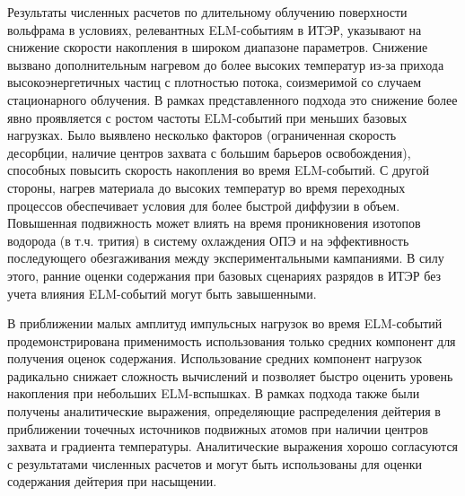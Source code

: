 Результаты численных расчетов по длительному облучению поверхности вольфрама в условиях, релевантных ELM-событиям в ИТЭР, указывают на снижение скорости накопления в широком диапазоне параметров. Снижение вызвано дополнительным нагревом до более высоких температур из-за прихода высокоэнергетичных частиц с плотностью потока, соизмеримой со случаем стационарного облучения. В рамках представленного подхода это снижение более явно проявляется с ростом частоты ELM-событий при меньших базовых нагрузках. Было выявлено несколько факторов (ограниченная скорость десорбции, наличие центров захвата с большим барьеров освобождения), способных повысить скорость накопления во время ELM-событий. С другой стороны, нагрев материала до высоких температур во время переходных процессов обеспечивает условия для более быстрой диффузии в объем. Повышенная подвижность может влиять на время проникновения изотопов водорода (в т.ч. трития) в систему охлаждения ОПЭ и на эффективность последующего обезгаживания между экспериментальными кампаниями. В силу этого, ранние оценки содержания при базовых сценариях разрядов в ИТЭР без учета влияния ELM-событий могут быть завышенными. 

В приближении малых амплитуд импульсных нагрузок во время ELM-событий продемонстрирована применимость использования только средних компонент для получения оценок содержания. Использование средних компонент нагрузок радикально снижает сложность вычислений и позволяет быстро оценить уровень накопления при небольших ELM-вспышках. В рамках подхода также были получены аналитические выражения, определяющие распределения дейтерия в приближении точечных источников подвижных атомов при наличии центров захвата и градиента температуры. Аналитические выражения хорошо согласуются с результатами численных расчетов и могут быть использованы для оценки содержания дейтерия при насыщении.

\clearpage
